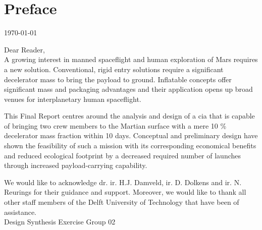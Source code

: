\section*{Preface}\label{cha:preface}

\begin{flushright}
	\today
\end{flushright}

Dear Reader,	
\\ [1cm]
A growing interest in manned spaceflight and human exploration of Mars requires a new solution. Conventional, rigid entry solutions require a significant decelerator mass to bring the payload to ground. Inflatable concepts offer significant mass and packaging advantages and their application opens up broad venues for interplanetary human spaceflight. 

This Final Report centres around the analysis and design of a \acrlong{cia} that is capable of bringing two crew members to the Martian surface with a mere 10 \% decelerator mass fraction within 10 days. Conceptual and preliminary design have shown the feasibility of such a mission with its corresponding economical benefits and reduced ecological footprint by a decreased required number of launches through increased payload-carrying capability.

We would like to acknowledge dr. ir. H.J. Damveld, ir. D. Dolkens and ir. N. Reurings for their guidance and support. Moreover, we would like to thank all other staff members of the Delft University of Technology that have been of assistance.
\\ [1.5cm]
Design Synthesis Exercise Group 02
